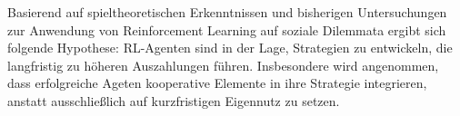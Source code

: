 Basierend auf spieltheoretischen Erkenntnissen und bisherigen Untersuchungen zur 
Anwendung von Reinforcement Learning auf soziale Dilemmata ergibt sich folgende Hypothese: 
RL-Agenten sind in der Lage, Strategien zu entwickeln, die langfristig zu höheren 
Auszahlungen führen. Insbesondere wird angenommen, dass erfolgreiche Ageten 
kooperative Elemente in ihre Strategie integrieren, anstatt ausschließlich auf 
kurzfristigen Eigennutz zu setzen.